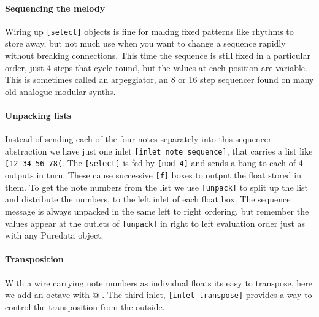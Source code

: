 \paragraph{Sequencing the melody}
Wiring up \verb+[select]+ objects is fine for making fixed patterns
like rhythms to store away, but not much use when you want to
change a sequence rapidly without breaking connections. 
This time the sequence is still fixed in a particular order, just 4 steps
that cycle round, but the values at each position are variable. This
is sometimes called an arpeggiator, an 8 or 16 step sequencer found on
many old analogue modular synths.

\paragraph{Unpacking lists}
Instead of sending each of the four notes separately into this 
sequencer abstraction we have just one inlet \verb+[inlet note sequence]+, that carries a list like \verb+[12 34 56 78(+.
The \verb+[select]+ is fed by \verb+[mod 4]+ and sends a bang to each
of 4 outputs in turn. These cause successive \verb+[f]+ boxes to output
the float stored in them. To get the note numbers from the list we 
use \verb+[unpack]+ to split up the list and distribute the numbers,
to the left inlet of each float box. The sequence message is always unpacked
in the same left to right ordering, but remember the values appear at the
outlets of \verb+[unpack]+ in right to left evaluation order just as with
any Puredata object.

\paragraph{Transposition}
With a wire carrying note numbers as individual floats its easy to transpose, here we add
an octave with \verb@[+ 12]@ . The third inlet, \verb+[inlet transpose]+ provides a way to control the
transposition from the outside.
